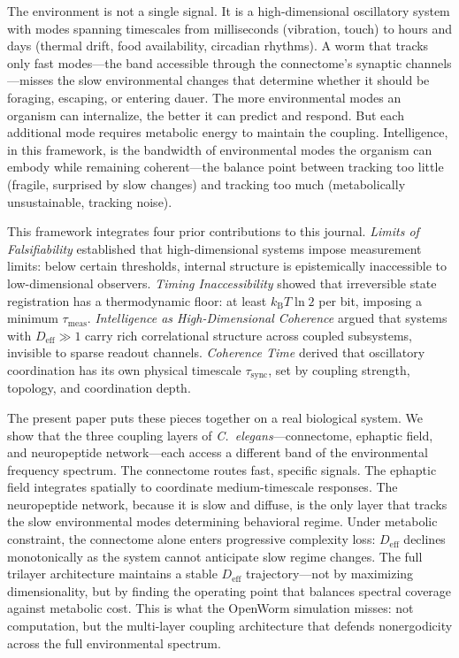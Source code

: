 \documentclass[12pt]{article}
\newcommand{\kB}{k_{\mathrm{B}}}
\newcommand{\Deff}{D_{\mathrm{eff}}}
\newcommand{\tsync}{\tau_{\mathrm{sync}}}
\newcommand{\tmeas}{\tau_{\mathrm{meas}}}
\begin{document}
\medskip

The environment is not a single signal. It is a high-dimensional oscillatory system with modes spanning timescales from milliseconds (vibration, touch) to hours and days (thermal drift, food availability, circadian rhythms). A worm that tracks only fast modes---the band accessible through the connectome's synaptic channels---misses the slow environmental changes that determine whether it should be foraging, escaping, or entering dauer. The more environmental modes an organism can internalize, the better it can predict and respond. But each additional mode requires metabolic energy to maintain the coupling. Intelligence, in this framework, is the bandwidth of environmental modes the organism can embody while remaining coherent---the balance point between tracking too little (fragile, surprised by slow changes) and tracking too much (metabolically unsustainable, tracking noise).

This framework integrates four prior contributions to this journal. \textit{Limits of Falsifiability} \cite{todd2025falsifiability} established that high-dimensional systems impose measurement limits: below certain thresholds, internal structure is epistemically inaccessible to low-dimensional observers. \textit{Timing Inaccessibility} \cite{todd2025demon} showed that irreversible state registration has a thermodynamic floor: at least $\kB T \ln 2$ per bit, imposing a minimum $\tmeas$. \textit{Intelligence as High-Dimensional Coherence} \cite{todd2025intelligence} argued that systems with $\Deff \gg 1$ carry rich correlational structure across coupled subsystems, invisible to sparse readout channels. \textit{Coherence Time} \cite{todd2026coherence} derived that oscillatory coordination has its own physical timescale $\tsync$, set by coupling strength, topology, and coordination depth.

The present paper puts these pieces together on a real biological system. We show that the three coupling layers of \textit{C.~elegans}---connectome, ephaptic field, and neuropeptide network---each access a different band of the environmental frequency spectrum. The connectome routes fast, specific signals. The ephaptic field integrates spatially to coordinate medium-timescale responses. The neuropeptide network, because it is slow and diffuse, is the only layer that tracks the slow environmental modes determining behavioral regime. Under metabolic constraint, the connectome alone enters progressive complexity loss: $\Deff$ declines monotonically as the system cannot anticipate slow regime changes. The full trilayer architecture maintains a stable $\Deff$ trajectory---not by maximizing dimensionality, but by finding the operating point that balances spectral coverage against metabolic cost. This is what the OpenWorm simulation misses: not computation, but the multi-layer coupling architecture that defends nonergodicity across the full environmental spectrum.
\end{document}

